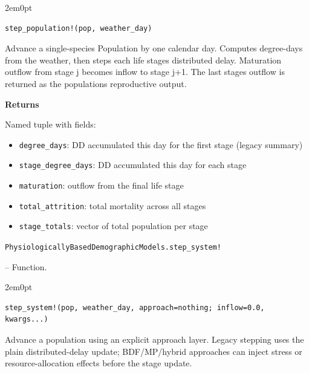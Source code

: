 \begin{adjustwidth}{2em}{0pt}


\begin{verbatim}
step_population!(pop, weather_day)
\end{verbatim}

Advance a single-species Population by one calendar day. Computes degree-days from the weather, then steps each life stage{\textquotesingle}s distributed delay. Maturation outflow from stage j becomes inflow to stage j+1. The last stage{\textquotesingle}s outflow is returned as the population{\textquotesingle}s reproductive output.

\textbf{Returns}

Named tuple with fields:

\begin{itemize}
\item \texttt{degree\_days}: DD accumulated this day for the first stage (legacy summary)


\item \texttt{stage\_degree\_days}: DD accumulated this day for each stage


\item \texttt{maturation}: outflow from the final life stage


\item \texttt{total\_attrition}: total mortality across all stages


\item \texttt{stage\_totals}: vector of total population per stage

\end{itemize}


\end{adjustwidth}
\hypertarget{2717529918997334986}{\texttt{PhysiologicallyBasedDemographicModels.step\_system!}}  -- {Function.}

\begin{adjustwidth}{2em}{0pt}


\begin{verbatim}
step_system!(pop, weather_day, approach=nothing; inflow=0.0, kwargs...)
\end{verbatim}

Advance a population using an explicit approach layer. Legacy stepping uses the plain distributed-delay update; BDF/MP/hybrid approaches can inject stress or resource-allocation effects before the stage update.



\end{adjustwidth}

